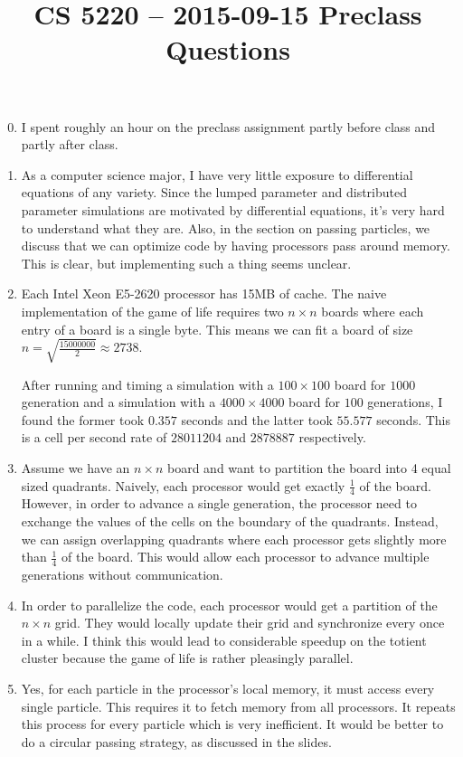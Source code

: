 \documentclass{hw}
\title{CS 5220 -- 2015-09-15 Preclass Questions}
\begin{document}
\maketitle{}

\begin{enumerate}
  \setcounter{enumi}{-1}
  \item
    I spent roughly an hour on the preclass assignment partly before class and
    partly after class.

  \item
    As a computer science major, I have very little exposure to differential
    equations of any variety. Since the lumped parameter and distributed
    parameter simulations are motivated by differential equations, it's very
    hard to understand what they are. Also, in the section on passing
    particles, we discuss that we can optimize code by having processors pass
    around memory. This is clear, but implementing such a thing seems unclear.

  \item
    Each Intel Xeon E5-2620 processor has 15MB of cache. The naive
    implementation of the game of life requires two $n \times n$ boards where
    each entry of a board is a single byte. This means we can fit a board of
    size $n = \sqrt{\frac{15000000}{2}} \approx 2738$.

    After running and timing a simulation with a $100 \times 100$ board for
    $1000$ generation and a simulation with a $4000 \times 4000$ board for
    $100$ generations, I found the former took $0.357$ seconds and the latter
    took $55.577$ seconds. This is a cell per second rate of $28011204$ and
    $2878887$ respectively.

  \item
    Assume we have an $n \times n$ board and want to partition the board into 4
    equal sized quadrants. Naively, each processor would get exactly
    $\frac{1}{4}$ of the board. However, in order to advance a single
    generation, the processor need to exchange the values of the cells on the
    boundary of the quadrants. Instead, we can assign overlapping quadrants
    where each processor gets slightly more than $\frac{1}{4}$ of the board.
    This would allow each processor to advance multiple generations without
    communication.

  \item
    In order to parallelize the code, each processor would get a partition of
    the $n \times n$ grid. They would locally update their grid and synchronize
    every once in a while. I think this would lead to considerable speedup on
    the totient cluster because the game of life is rather pleasingly parallel.

  \item
    Yes, for each particle in the processor's local memory, it must access
    every single particle. This requires it to fetch memory from all
    processors. It repeats this process for every particle which is very
    inefficient. It would be better to do a circular passing strategy, as
    discussed in the slides.
\end{enumerate}
\end{document}
